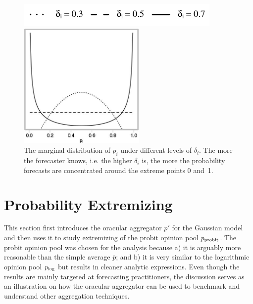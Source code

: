 \documentclass[11pt]{article}
\theoremstyle{definition}
\theoremstyle{definition}
\def\probit{p_{\rm probit}}
\def\plog{p_{\rm log}}
\begin{document}
\begin{figure}[t]
\centering
	\hspace{0em}\includegraphics{LegendMarginal}

 \includegraphics[width= 0.55\textwidth]{Marginals}
   \caption{The marginal distribution of $p_i$ under different levels of 
$\delta_i$.  The more the forecaster knows, i.e. the higher $\delta_i$ is, 
the more the probability forecasts are concentrated around the extreme 
points 0 and~1.}
\label{marginals}
\end{figure}

\section{Probability Extremizing}
\label{extremizing}
This section first introduces the oracular aggregator $p'$ for the
Gaussian model and then uses it to study
extremizing of the probit opinion pool $\probit$. The probit opinion 
pool  was chosen for the analysis because a) it is arguably more
reasonable than the simple average $\bar{p}$; and b) it is very
similar to the logarithmic opinion pool $\plog$ but results in cleaner
analytic expressions. Even though the results are mainly targeted at forecasting practitioners, the discussion serves as an illustration on how the oracular aggregator can be used to benchmark and understand other aggregation techniques. 
\end{document}
